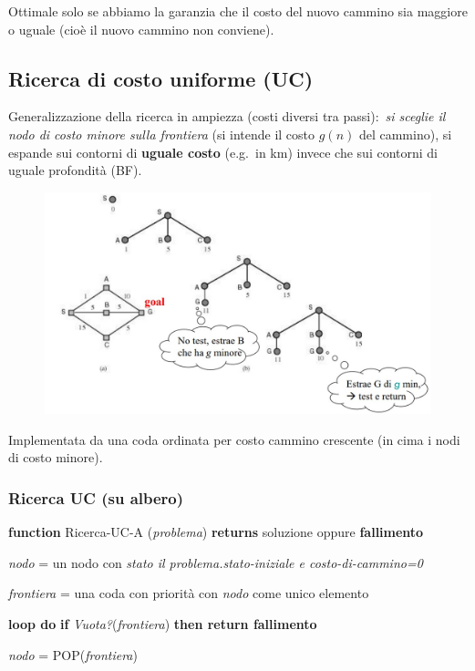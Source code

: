 Ottimale solo se abbiamo la garanzia che il costo del nuovo cammino sia maggiore o uguale (cioè il nuovo cammino non conviene).

\subsection{Ricerca di costo uniforme (UC)}

Generalizzazione della ricerca in ampiezza (costi diversi tra passi):\ \textit{si sceglie il nodo di costo minore sulla frontiera} (si intende il costo $g(n)$ del cammino), si espande sui contorni di \textbf{uguale costo} (e.g.\ in km) invece che sui contorni di uguale profondità (BF).

\begin{figure}[H]
	\centering
	\includegraphics[width=\textwidth]{immagini/UC.jpg}
\end{figure}

\noindent Implementata da una coda ordinata per costo cammino crescente (in cima i nodi di costo minore).\

\subsubsection{Ricerca UC (su albero)}
\textbf{function} Ricerca-UC-A (\textit{problema}) \textbf{returns} soluzione oppure \textbf{fallimento}

\textit{nodo} = un nodo con \textit{stato il problema.stato-iniziale e costo-di-cammino=0}

\textit{frontiera} = una coda con priorità con \textit{nodo} come unico elemento

\textbf{loop do}
\quad \textbf{if} \textit{Vuota?}(\textit{frontiera}) \textbf{then return fallimento}

\quad \textit{nodo} = POP(\textit{frontiera})

